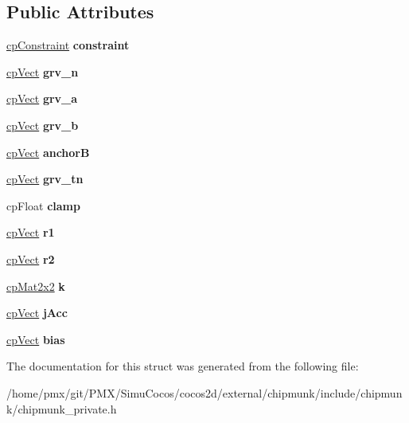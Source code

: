 \subsection*{Public Attributes}
\begin{DoxyCompactItemize}
\item 
\mbox{\label{structcpGrooveJoint_ace538974771b2451ff70e390a45331dd}} 
\hyperlink{structcpConstraint}{cp\+Constraint} {\bfseries constraint}
\item 
\mbox{\label{structcpGrooveJoint_aeb76e2ae638c54a139b2c3cfe42d5156}} 
\hyperlink{structcpVect}{cp\+Vect} {\bfseries grv\+\_\+n}
\item 
\mbox{\label{structcpGrooveJoint_af0379447d1b65fac0796bea674c4bcc8}} 
\hyperlink{structcpVect}{cp\+Vect} {\bfseries grv\+\_\+a}
\item 
\mbox{\label{structcpGrooveJoint_a35db57ba915f335aa1d2e7166d717dd7}} 
\hyperlink{structcpVect}{cp\+Vect} {\bfseries grv\+\_\+b}
\item 
\mbox{\label{structcpGrooveJoint_a3a883b8d3c31700b2269a9a049a82cdc}} 
\hyperlink{structcpVect}{cp\+Vect} {\bfseries anchorB}
\item 
\mbox{\label{structcpGrooveJoint_a83f1d7191fd95192d586276f6da9e9ac}} 
\hyperlink{structcpVect}{cp\+Vect} {\bfseries grv\+\_\+tn}
\item 
\mbox{\label{structcpGrooveJoint_ab443f50c8e95df7153215af6ae9699f9}} 
cp\+Float {\bfseries clamp}
\item 
\mbox{\label{structcpGrooveJoint_afe9dd098205f571cc637f89c4e952dc4}} 
\hyperlink{structcpVect}{cp\+Vect} {\bfseries r1}
\item 
\mbox{\label{structcpGrooveJoint_ad0dcb895562c9f33f0e13a27fb079800}} 
\hyperlink{structcpVect}{cp\+Vect} {\bfseries r2}
\item 
\mbox{\label{structcpGrooveJoint_abf71a39fc1198bc6cc62d11ea5f68af4}} 
\hyperlink{structcpMat2x2}{cp\+Mat2x2} {\bfseries k}
\item 
\mbox{\label{structcpGrooveJoint_a208102ecfa8a5096311acd126762f82c}} 
\hyperlink{structcpVect}{cp\+Vect} {\bfseries j\+Acc}
\item 
\mbox{\label{structcpGrooveJoint_a33a40d28da62cc7bbd74fc3bfa68f0bf}} 
\hyperlink{structcpVect}{cp\+Vect} {\bfseries bias}
\end{DoxyCompactItemize}


The documentation for this struct was generated from the following file\+:\begin{DoxyCompactItemize}
\item 
/home/pmx/git/\+P\+M\+X/\+Simu\+Cocos/cocos2d/external/chipmunk/include/chipmunk/chipmunk\+\_\+private.\+h\end{DoxyCompactItemize}
